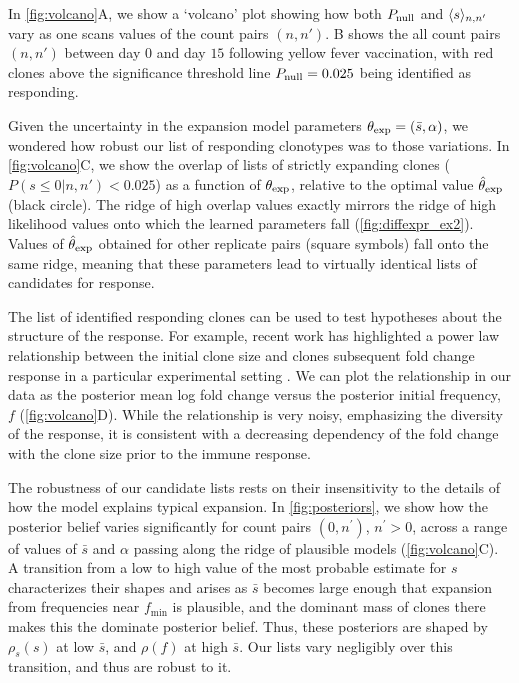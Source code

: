 In \cref{fig:volcano}A, we show a `volcano' plot showing how both $P_{\rm null}$ and $\langle s\rangle_{n,n'}$ vary as one scans values of the count pairs $(n,n')$. B shows the all count pairs $(n,n')$ between day $0$ and day $15$ following yellow fever vaccination, with red clones above the significance threshold line $P_{\rm null}=0.025$ being identified as responding.

Given the uncertainty in the expansion model parameters $\theta_{\rm exp}=(\bar s,\alpha)$, we wondered how robust our list of responding clonotypes was to those variations. In \cref{fig:volcano}C, we show the overlap of lists of strictly expanding clones ($P(s\leq 0|n,n')<0.025$) as a function of $\theta_{\rm exp}$, relative to the optimal value $\hat\theta_{\rm exp}$ (black circle). The ridge of high overlap values exactly mirrors the ridge of high likelihood values onto which the learned parameters fall (\cref{fig:diffexpr_ex2}). Values of $\hat \theta_{\rm exp}$ obtained for other replicate pairs (square symbols) fall onto the same ridge, meaning that these parameters lead to virtually identical lists of candidates for response.

The list of identified responding clones can be used to test hypotheses about the structure of the response. For example, recent work has highlighted a power law relationship between the initial clone size and clones subsequent fold change response in a particular experimental setting \cite{Mayer2019}. We can plot the relationship in our data as the posterior mean log fold change versus the posterior initial frequency, $f$ (\cref{fig:volcano}D). While the relationship is very noisy, emphasizing the diversity of the response, it is consistent with a decreasing dependency of the fold change with the clone size prior to the immune response.

The robustness of our candidate lists rests on their insensitivity to the details of how the model explains typical expansion. In \cref{fig:posteriors}, we show how the posterior belief varies significantly for count pairs $(0,n^\prime)$, $n^\prime>0$, across a range of values of $\bar{s}$ and $\alpha$ passing along the ridge of plausible models (\cref{fig:volcano}C). A transition from a low to high value of the most probable estimate for $s$ characterizes their shapes and arises as $\bar{s}$ becomes large enough that expansion from frequencies near $f_\textrm{min}$ is plausible, and the dominant mass of clones there makes this the dominate posterior belief. Thus, these posteriors are shaped by $\rho_s(s)$ at low $\bar{s}$, and $\rho(f)$ at high $\bar{s}$. Our lists vary negligibly over this transition, and thus are robust to it.

